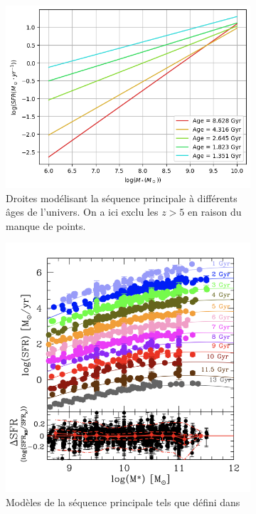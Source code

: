 \documentclass[12pt, a4paper]{article}
\begin{document}
\begin{figure}[!h]
  \centering
     \begin{subfigure}[t]{0.5\textwidth}
         \centering
         \includegraphics[width=\textwidth]{assets/main_sequence_fit.png}
         \caption{Droites modélisant la séquence principale à différents âges de l'univers. On a ici exclu les $z > 5$ en raison du manque de points.}
     \end{subfigure}
     \hfill
     \begin{subfigure}[t]{0.4\textwidth}
         \centering
         \includegraphics[width=\textwidth]{assets/main_sequence_theory.PNG}
         \caption{Modèles de la séquence principale tels que défini dans \cite{10.1093_mnras_stac3214}}
     \end{subfigure}
     \caption{}
     \label{fig:main_sequence_fit}
\end{figure}
\end{document}
